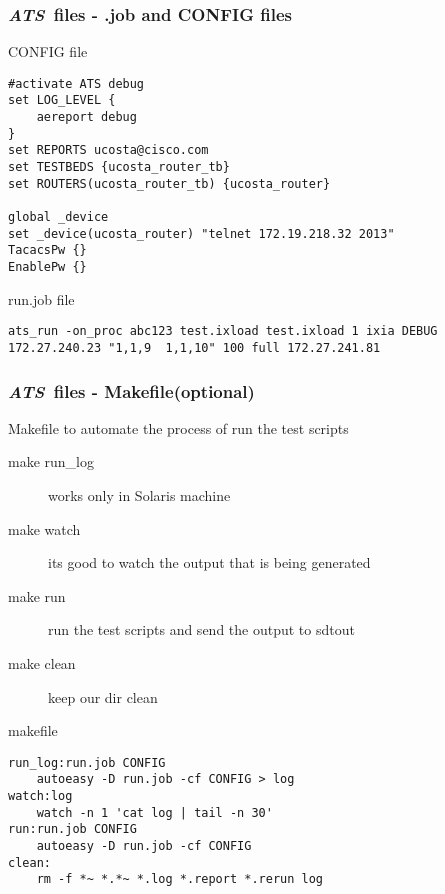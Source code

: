 \documentclass{beamer}
\newcommand{\ats}{\emph{ATS}}
\begin{document}
\begin{frame}[fragile] \frametitle{\ats~files - .job and CONFIG files}
\begin{block}{CONFIG file}
\begin{lstlisting}[language=Terminal]
#activate ATS debug
set LOG_LEVEL { 
    aereport debug
}
set REPORTS ucosta@cisco.com
set TESTBEDS {ucosta_router_tb}
set ROUTERS(ucosta_router_tb) {ucosta_router}

global _device
set _device(ucosta_router) "telnet 172.19.218.32 2013"
TacacsPw {}
EnablePw {}

\end{lstlisting}
\end{block}
\begin{block}{run.job file}
\begin{lstlisting}[language=Terminal]
ats_run -on_proc abc123 test.ixload test.ixload 1 ixia DEBUG  172.27.240.23 "1,1,9  1,1,10" 100 full 172.27.241.81
\end{lstlisting}
\end{block}
\end{frame}

\begin{frame}[fragile] \frametitle{\ats~files - Makefile(optional)}
Makefile to automate the process of run the test scripts
\begin{description}
	\item[make run\_log] works only in Solaris machine
	\item[make watch] its good to watch the output that is being generated
	\item[make run] run the test scripts and send the output to sdtout
	\item[make clean] keep our dir clean
\end{description}
\begin{block}{makefile}
\begin{lstlisting}[language=Terminal]
run_log:run.job CONFIG
    autoeasy -D run.job -cf CONFIG > log
watch:log
    watch -n 1 'cat log | tail -n 30'
run:run.job CONFIG
    autoeasy -D run.job -cf CONFIG
clean:
    rm -f *~ *.*~ *.log *.report *.rerun log
\end{lstlisting}
\end{block}
\end{frame}
\end{document}
